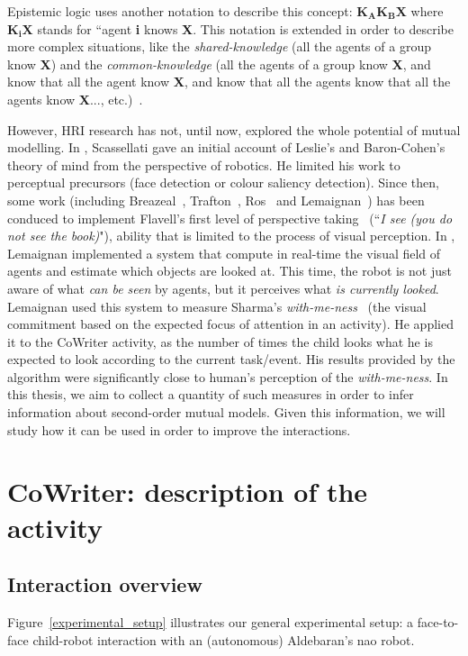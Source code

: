\documentclass[10pt,a4paper]{article}
\begin{document}
Epistemic logic uses another notation to describe this concept: $\textbf{K}_{\textbf{A}}\textbf{K}_{\textbf{B}}\textbf{X}$ where $\textbf{K}_{\textbf{i}}\textbf{X}$ stands for ``agent \textbf{i} knows \textbf{X}. This notation is extended in order to describe more complex situations, like the \textit{shared-knowledge} (all the agents of a group know \textbf{X}) and the \textit{common-knowledge} (all the agents of a group know \textbf{X}, and know that all the agent know \textbf{X}, and know that all the agents know that all the agents know \textbf{X}..., etc.)~\cite{hendricks2008epistemic}. 

However, HRI research has not, until now, explored the whole potential of mutual modelling. In \cite{scassellati2002theory}, Scassellati gave an initial account of Leslie's and Baron-Cohen's theory of mind from the perspective of robotics. He limited his work to perceptual precursors (face detection or colour saliency detection). Since then, some work (including Breazeal~\cite{breazeal2006using}, Trafton~\cite{Trafton2005}, Ros~\cite{Ros2010} and Lemaignan~\cite{lemaignan2012thesis}) has been conduced to implement Flavell's first level of perspective taking~\cite{flavell1977development} (``\textit{I see (you do not see the book)}"), ability that is limited to the process of visual perception. In \cite{lemaignan2016realtime}, Lemaignan implemented a system that compute in real-time the visual field of agents and estimate which objects are looked at. This time, the robot is not just aware of what \textit{can be seen} by agents, but it perceives what \textit{is currently looked}. Lemaignan used this system to measure Sharma's \textit{with-me-ness}~\cite{sharma2014me} (the visual commitment based on the expected focus of attention in an activity). He applied it to the CoWriter activity, as the number of times the child looks what he is expected to look according to the current task/event. His results provided by the algorithm were significantly close to human's perception of the \textit{with-me-ness}. In this thesis, we aim to collect a quantity of such measures in order to infer information about second-order mutual models. Given this information, we will study how it can be used in order to improve the interactions.


\section{CoWriter: description of the activity}
\subsection{Interaction overview}
Figure~\ref{experimental_setup} illustrates our general experimental setup: a
face-to-face child-robot interaction with an (autonomous) Aldebaran's {\sc nao}
robot.
\end{document}
